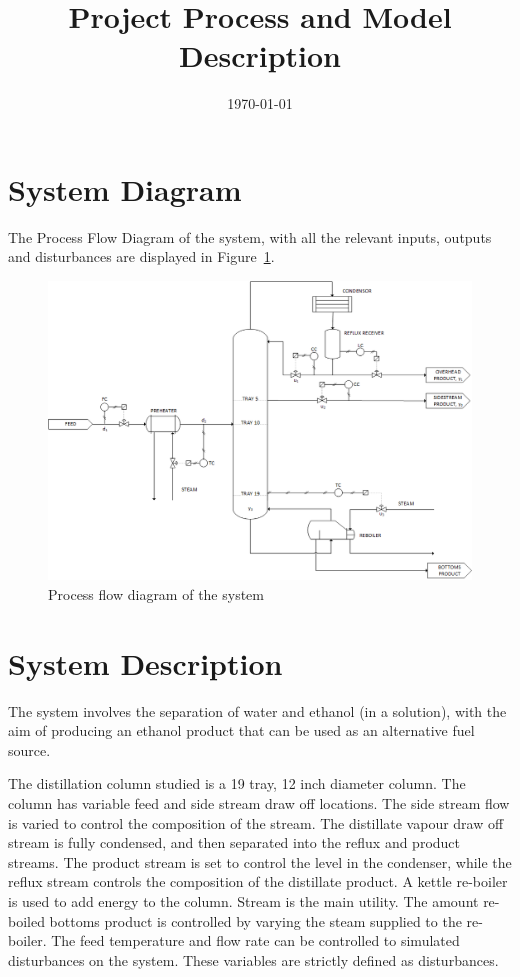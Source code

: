 \documentclass[a4paper,12pt]{article}
\title{Project Process and  Model Description}
\date{\today}
\begin{document}
\maketitle

\section{System Diagram}

The Process Flow Diagram of the system, with all the relevant inputs, outputs and disturbances are displayed in Figure~\ref{fig:PFD}.

\begin{figure}[tbph]
	\centering
	\includegraphics[width=0.9\linewidth]{../Process_PFD}
	\caption{Process flow diagram of the system}
	\label{fig:PFD}
\end{figure}

\newpage
\section{System Description}

The system involves the separation of water and ethanol (in a solution), with the aim of producing an ethanol product that can be used as an alternative fuel source.

The distillation column studied is a 19 tray, 12 inch diameter column. The column has variable feed and side stream draw off locations. The side stream flow is varied to control the composition of the stream. The distillate vapour draw off stream is fully condensed, and then separated into the reflux and product streams. The product stream is set to control the level in the condenser, while the reflux stream controls the composition of the distillate product. A kettle re-boiler is used to add energy to the column. Stream is the main utility. The amount re-boiled bottoms product is controlled by varying the steam supplied to the re-boiler. The feed temperature and flow rate can be controlled to simulated disturbances on the system. These variables are strictly defined as disturbances.
\end{document}
